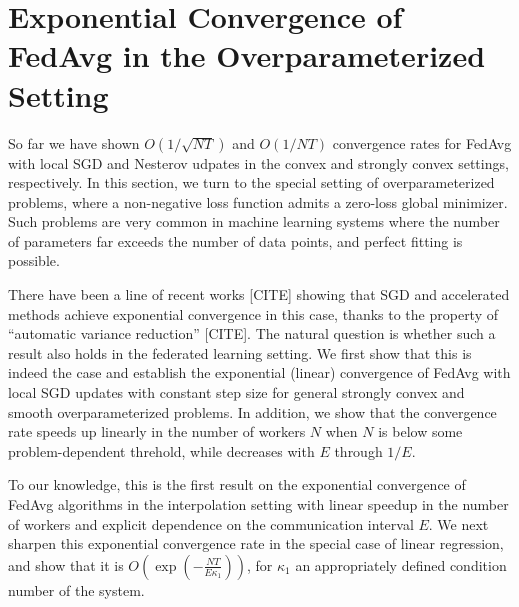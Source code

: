 


\section{Exponential Convergence of FedAvg in the Overparameterized Setting}

So far we have shown $O(1/\sqrt{NT})$ and $O(1/NT)$ convergence
rates for FedAvg with local SGD and Nesterov udpates in the convex
and strongly convex settings, respectively. In this section, we turn
to the special setting of overparameterized problems, where a non-negative
loss function admits a zero-loss global minimizer. Such problems are
very common in machine learning systems where the number of parameters
far exceeds the number of data points, and perfect fitting is possible. 

There have been a line of recent works {[}CITE{]} showing that SGD
and accelerated methods achieve exponential convergence in this case,
thanks to the property of ``automatic variance reduction'' {[}CITE{]}.
The natural question is whether such a result also holds in the federated
learning setting. We first show that this is indeed the case and establish
the exponential (linear) convergence of FedAvg with local SGD updates
with constant step size for general strongly convex and smooth overparameterized
problems. In addition, we show that the convergence rate speeds up
linearly in the number of workers $N$ when $N$ is below some problem-dependent
threhold, while decreases with $E$ through $1/E$. 

To our knowledge, this is the first result on the exponential convergence
of FedAvg algorithms in the interpolation setting with linear speedup
in the number of workers and explicit dependence on the communication
interval $E$. We next sharpen this exponential convergence rate in
the special case of linear regression, and show that it is $O(\exp(-\frac{NT}{E\kappa_{1}}))$,
for $\kappa_{1}$ an appropriately defined condition number of the
system. 

